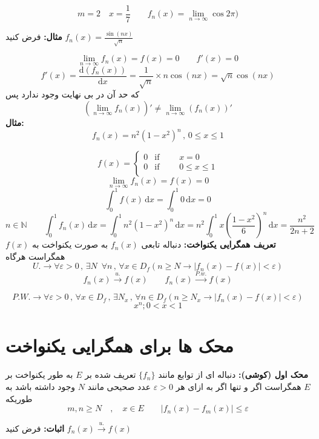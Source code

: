 \documentclass[12pt]{report}
\begin{document}
\[
m = 2 \quad x = \frac{1}{7} \qquad f_n(x) = \lim_{n \to \infty} \cos 2 \pi )
\]

\textbf{مثال:}
فرض کنید
$f_n(x) = \frac{\sin(nx)}{\sqrt n}$

\[
\lim_{n \to \infty} f_n(x) = f(x) = 0 \qquad f'(x) = 0
\]
\[
f'(x) = \frac{\mathrm{d}(f_n(x))}{\mathrm{d}x} = \frac{1}{\sqrt n} \times n \cos (nx) = \sqrt n \cos(nx)
\]
که حد آن در بی نهایت وجود ندارد پس
\[
(\lim_{n \to \infty} f_n(x))' \neq \lim_{n \to \infty} (f_n(x))'
\] 
\textbf{مثال:}
\[
f_n(x) = n^2 (1 - x^2)^n \, ,\, 0 \leq x \leq 1
\]

\begin{equation*}
	f(x) =
	\begin{cases}
		0 & \text{if }\qquad x = 0 \\
		0 & \text{if }\qquad  0 \leq x \leq 1\\
		
	\end{cases}
\end{equation*}
\[
\lim_{n \to \infty} f_n(x) = f(x) = 0
\]
\[
\int_{0}^{1} f(x) \,\mathrm{d}x = \int_{0}^{1} 0\, \mathrm{d}x = 0
\]
\[
n \in \mathbb{N} \qquad \int_{0}^{1} f_n(x)\,\mathrm{d}x = \int_{0}^{1} n^2 (1 - x^2)^n \,\mathrm{d}x = n^2 \int_{0}^{1} x (\frac{1 - x^2}{6})^n \,\mathrm{d}x = \frac{n^2}{2n + 2}
\]
\textbf{ تعریف همگرایی یکنواخت:}
دنباله تابعی 
$f_n(x)$
به صورت یکنواخت به
$f(x)$
همگراست هرگاه
\[
 U. \rightarrow \forall \varepsilon > 0 \, , \, \exists N \,\,\, \forall n \,,\, \forall x   \in D_f (n  \geq N \rightarrow |f_n(x) - f(x)| < \varepsilon)
\]
\[
f_n(x)  \overset{u.}{\rightarrow} f(x) \qquad f_n(x)  \overset{P.w.}{\rightarrow} f(x)
\]

\[
 P.W. \rightarrow \forall \varepsilon > 0 \, ,\, \forall x \in D_f \,,\, \exists N_x \,,\, \forall n   \in D_f (n  \geq N_x \rightarrow |f_n(x) - f(x)| < \varepsilon)
\]
\[
x^n ; 0 < x < 1
\]


\section{محک ها برای همگرایی یکنواخت}


\textbf{محک اول (کوشی):}
 دنباله ای از توابع مانند 
$\{f_n\}$
تعریف شده بر
$E$
به طور یکنواخت بر 
$E$
 همگراست اگر و تنها اگر به ازای هر
 $\varepsilon > 0$
 عدد صحیحی مانند 
 $N$
  وجود داشته باشد به طوریکه
  \[
  m , n \geq N \quad , \quad x \in E \qquad |f_n(x) - f_m(x)| \leq \varepsilon
  \]
  
  \textbf{اثبات:}
  فرض کنید 
  $f_n(x)  \overset{u.}{\rightarrow} f(x)$
  
\end{document}
